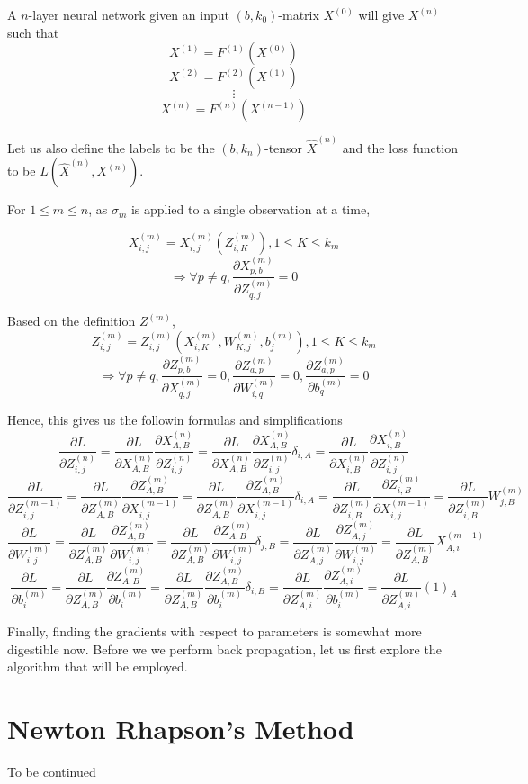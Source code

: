 \documentclass{article}
\begin{document}
A \(n\)-layer neural network given an input \((b, k_0)\)-matrix \(X^{(0)}\) will give \(X^{(n)}\) such that
    \[X^{(1)} = F^{(1)}(X^{(0)})\]
    \[X^{(2)} = F^{(2)}(X^{(1)})\]
    \[\vdots\]
    \[X^{(n)} = F^{(n)}(X^{(n-1)})\]

Let us also define the labels to be the \((b, k_n)\)-tensor \(\hat{X}^{(n)}\) and the loss function to be \(L(\hat{X}^{(n)}, X^{(n)})\).

For \(1 \le m \le n\), as \(\sigma_m\) is applied to a single observation at a time,

\[X^{(m)}_{i, j} = X^{(m)}_{i, j}(Z^{(m)}_{i, K}), 1 \le K \le k_m\]  
\[\Rightarrow \forall p \neq q, 
\frac{\partial X^{(m)}_{p,b}}{\partial Z^{(m)}_{q,j}} = 0
\]

Based on the definition \(Z^{(m)}\),
\[Z^{(m)}_{i, j} = Z^{(m)}_{i, j}(X^{(m)}_{i, K}, W^{(m)}_{K, j}, b^{(m)}_j), 1 \le K \le k_m
\]
\[\Rightarrow \forall p \neq q, 
\frac{\partial Z^{(m)}_{p,b}}{\partial X^{(m)}_{q,j}} = 0, 
\frac{\partial Z^{(m)}_{a,p}}{\partial W^{(m)}_{i,q}} = 0,
\frac{\partial Z^{(m)}_{a,p}}{\partial b^{(m)}_q} = 0
\]

Hence, this gives us the followin formulas and simplifications
\[
\frac{\partial L}{\partial Z^{(n)}_{i,j}}
= \frac{\partial L}{\partial X^{(n)}_{A,B}}
\frac{\partial X^{(n)}_{A,B}}{\partial Z^{(n)}_{i,j}}
= \frac{\partial L}{\partial X^{(n)}_{A,B}}
\frac{\partial X^{(n)}_{A,B}}{\partial Z^{(n)}_{i,j}}
\delta_{i, A}  
= \frac{\partial L}{\partial X^{(n)}_{i,B}}
\frac{\partial X^{(n)}_{i,B}}{\partial Z^{(n)}_{i,j}}
\]
\[\frac{\partial L}{\partial Z^{(m-1)}_{i, j}} 
= \frac{\partial L}{\partial Z^{(m)}_{A, B}}
\frac{\partial Z^{(m)}_{A, B}}{\partial X^{(m-1)}_{i, j}}
= \frac{\partial L}{\partial Z^{(m)}_{A, B}}
\frac{\partial Z^{(m)}_{A, B}}{\partial X^{(m-1)}_{i, j}}
\delta_{i, A}
= \frac{\partial L}{\partial Z^{(m)}_{i, B}}
\frac{\partial Z^{(m)}_{i, B}}{\partial X^{(m-1)}_{i, j}}
= \frac{\partial L}{\partial Z^{(m)}_{i, B}} W^{(m)}_{j, B}
\]
\[\frac{\partial L}{\partial W^{(m)}_{i, j}} 
= \frac{\partial L}{\partial Z^{(m)}_{A, B}}
\frac{\partial Z^{(m)}_{A, B}}{\partial W^{(m)}_{i, j}}
= \frac{\partial L}{\partial Z^{(m)}_{A, B}}
\frac{\partial Z^{(m)}_{A, B}}{\partial W^{(m)}_{i, j}}
\delta_{j, B}
= \frac{\partial L}{\partial Z^{(m)}_{A, j}}
\frac{\partial Z^{(m)}_{A, j}}{\partial W^{(m)}_{i, j}}
= \frac{\partial L}{\partial Z^{(m)}_{A, B}}X^{(m-1)}_{A, i}
\]
\[\frac{\partial L}{\partial b^{(m)}_{i}} 
= \frac{\partial L}{\partial Z^{(m)}_{A, B}}
\frac{\partial Z^{(m)}_{A, B}}{\partial b^{(m)}_{i}}
= \frac{\partial L}{\partial Z^{(m)}_{A, B}}
\frac{\partial Z^{(m)}_{A, B}}{\partial b^{(m)}_{i}}
\delta_{i, B}
= \frac{\partial L}{\partial Z^{(m)}_{A, i}}
\frac{\partial Z^{(m)}_{A, i}}{\partial b^{(m)}_{i}}
= \frac{\partial L}{\partial Z^{(m)}_{A, i}} (1)_A
\]

Finally, finding the gradients with respect to parameters is somewhat more digestible now. Before we we perform back propagation, let us first explore the algorithm that will be employed. 

\section{Newton Rhapson's Method}

To be continued
\end{document}
